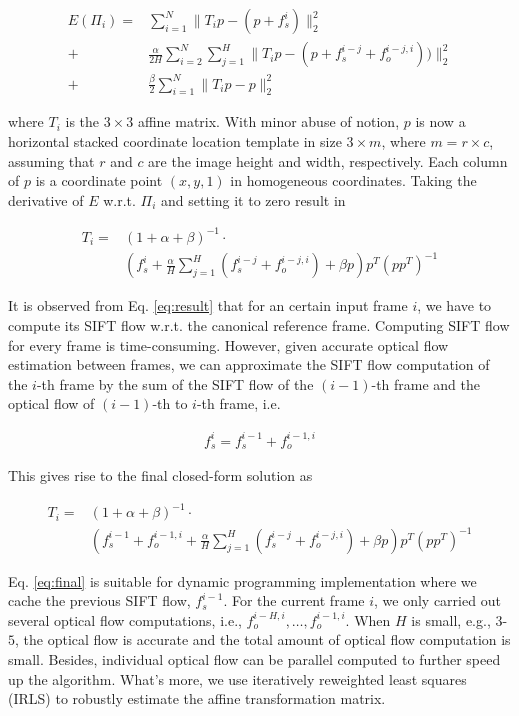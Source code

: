 \documentclass[10pt,journal]{IEEEtran}
\begin{document}
\begin{align}
	\label{data_affine}
E(\Pi_i)=&\sum_{i=1}^{N}\parallel{T_ip-(p+f_s^i)}\parallel_2^2
\\\label{smooth_affine}
				+&\frac{\alpha}{2H}\sum_{i=2}^{N}\sum_{j=1}^{H}\parallel{T_ip-(p+f_s^{i-j}+f_o^{i-j,i}))}\parallel_2^2
\\\label{penalty_affine}
				+&\frac{\beta}{2}\sum_{i=1}^{N}\parallel{T_ip-p}\parallel_2^2
\end{align} 

\noindent where $T_i$ is the $3\times3$ affine matrix. With minor
 abuse of notion, $p$ is now a horizontal stacked coordinate location template in size $3\times m$, where $m=r\times c$, assuming that $r$ and $c$ are the image height and width, respectively. Each column of $p$ is a coordinate point $(x,y,1)$ in homogeneous coordinates. Taking the derivative of $E$ w.r.t. $\Pi_i$ and setting it to zero result in 

\begin{align}
\label{eq:result}
T_i=&(1+\alpha+\beta)^{-1}\cdot \nonumber \\
		&(f_s^i+\frac{\alpha}{H}\sum_{j=1}^H(f_s^{i-j}+f_o^{i-j,i})+\beta{p})p^T(pp^T)^{-1}
\end{align}

It is observed from Eq. \ref{eq:result} that for an certain input frame $i$, we have to compute its SIFT flow w.r.t. the canonical reference frame. Computing SIFT flow for every frame is time-consuming. However, given accurate optical flow estimation between frames, we can approximate the SIFT flow computation of the $i$-th frame by the sum of the SIFT flow of the $(i-1)$-th frame and the optical flow of $(i-1)$-th to $i$-th frame, i.e.

\begin{align}
\label{eq:approx}
f_s^i=f_s^{i-1}+f_o^{i-1,i}
\end{align}

This gives rise to the final closed-form solution as

\begin{align}
\label{eq:final}
T_i=&(1+\alpha+\beta)^{-1}\cdot \nonumber \\
		&(f_s^{i-1}+f_o^{i-1,i}+\frac{\alpha}{H}\sum_{j=1}^H(f_s^{i-j}+f_o^{i-j,i})+\beta{p})p^T(pp^T)^{-1}
\end{align}

Eq. \ref{eq:final} is suitable for dynamic programming implementation where we cache the previous SIFT flow, $f_s^{i-1}$. For the current frame $i$, we only carried out several optical flow computations, i.e., $f_o^{i-H,i},\ldots,f_o^{i-1,i}$. When $H$ is small, e.g., $3$-$5$, the optical flow is accurate and the total amount of optical flow computation is small. Besides, individual optical flow can be parallel computed to further speed up the algorithm. What's more, we use iteratively reweighted least squares (IRLS) \cite{Huber81} to robustly estimate the affine transformation matrix. 
\end{document}
